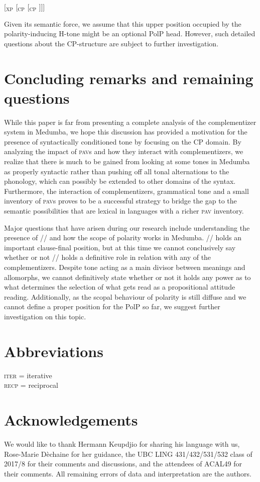 \documentclass[output=paper,colorlinks,citecolor=brown]{langscibook}
\begin{document}
\ea \label{struc2}
    {[$_{\text{XP}}$  [$_{\text{CP}}$ \text{ {\mbuL} } [$_{\text{CP}}$ ]]]}
\z

Given its semantic force, we assume that this upper position occupied by the polarity-inducing H-tone might be an optional PolP head. However, such detailed questions about the CP-structure are subject to further investigation.

\section{Concluding remarks and remaining questions}

While this paper is far from presenting a complete analysis of the complementizer system in Medumba, we hope this discussion has provided a motivation for the presence of syntactically conditioned tone by focusing on the CP domain. By analyzing the impact of \textsc{pav}s and how they interact with  complementizers, we realize that there is much to be gained from looking at some tones in Medumba as properly syntactic rather than pushing off all tonal alternations to the phonology, which can possibly be extended to other domains of the syntax. Furthermore, the interaction of complementizers, grammatical tone and a small inventory of \textsc{pav}s proves to be a successful strategy to bridge the gap to the semantic possibilities that are lexical in languages with a richer \textsc{pav} inventory.

Major questions that have arisen during our research include understanding the presence of /\la/ and how the scope of polarity works in Medumba. /\la/ holds an important clause-final position, but at this time we cannot conclusively say whether or not /\la/ holds a definitive role in relation with any of the complementizers. Despite tone acting as a main divisor between meanings and allomorphs, we cannot definitively state whether or not it holds any power as to what determines the selection of what gets read as a propositional attitude reading. Additionally, as the scopal behaviour of polarity is still diffuse and we cannot define a proper position for the PolP so far, we suggest further investigation on this topic.

\section*{Abbreviations}

\textsc{iter} = iterative \\
\textsc{recp} = reciprocal

\section*{Acknowledgements}

We would like to thank Hermann Keupdjio for sharing his language with us, Rose-Marie Dèchaine for her guidance, the UBC LING 431/432/531/532 class of 2017/8 for their comments and discussions, and the attendees of ACAL49 for their comments. All remaining errors of data and interpretation are the authors.

\printbibliography[heading=subbibliography,notkeyword=this]
\end{document}
